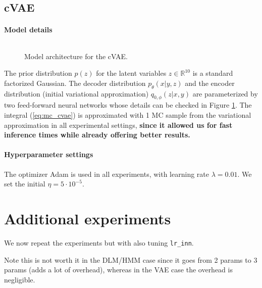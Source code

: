 \subsection{cVAE}




\paragraph{Model details}
\begin{figure}[!htp]
\centering
{}
\inputminted[fontsize=\scriptsize]{python}{./arch.tex}
\caption{Model architecture for the cVAE.}
\label{fig:arch}
\end{figure}
The prior distribution $p(z)$ for the latent variables $z \in \mathbb{R}^{10}$ is a standard factorized Gaussian. The decoder distribution $p_\theta(x|y,z)$ and the encoder distribution (initial variational approximation) $q_{0,\phi}(z|x,y)$ are parameterized by two feed-forward neural networks whose details can be checked in Figure \ref{fig:arch}.
The integral (\ref{eq:mc_cvae}) is approximated with 1 MC sample from the variational approximation in all experimental settings, {\bf since it allowed us for fast inference times while already offering better results.}
\paragraph{Hyperparameter settings}
The optimizer Adam is used in all experiments, with  learning rate $\lambda=0.01$. We set the initial $\eta = 5\cdot 10^{-5}$.




\iffalse
\section{Additional experiments}

We now repeat the experiments but with also tuning \texttt{lr\_inn}.

Note this is not worth it in the DLM/HMM case since it goes from 2 params to 3 params (adds a lot of overhead), whereas in the VAE case the overhead is negligible.



